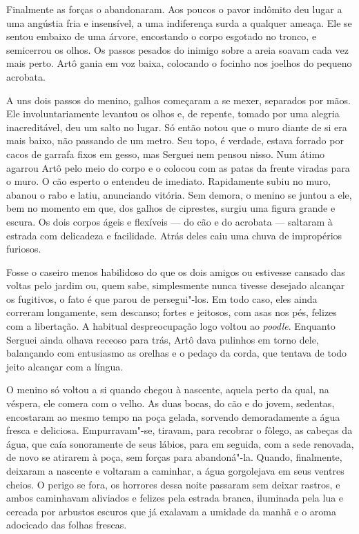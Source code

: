 Finalmente as forças o abandonaram. Aos poucos o pavor indômito deu
lugar a uma angústia fria e insensível, a uma indiferença surda a
qualquer ameaça. Ele se sentou embaixo de uma árvore, encostando o corpo
esgotado no tronco, e semicerrou os olhos. Os passos pesados do inimigo
sobre a areia soavam cada vez mais perto. Artô gania em voz baixa,
colocando o focinho nos joelhos do pequeno acrobata.

A uns dois passos do menino, galhos começaram a se mexer, separados por
mãos. Ele involuntariamente levantou os olhos e, de repente, tomado por
uma alegria inacreditável, deu um salto no lugar. Só então notou que o
muro diante de si era mais baixo, não passando de um metro. Seu topo, é
verdade, estava forrado por cacos de garrafa fixos em gesso, mas Serguei
nem pensou nisso. Num átimo agarrou Artô pelo meio do corpo e o
colocou com as patas da frente viradas para o muro. O cão esperto o
entendeu de imediato. Rapidamente subiu no muro, abanou o rabo e latiu,
anunciando vitória. Sem demora, o menino se juntou a ele, bem no momento
em que, dos galhos de ciprestes, surgiu uma figura grande e escura. Os
dois corpos ágeis e flexíveis --- do cão e do acrobata --- saltaram à estrada com delicadeza e facilidade. Atrás deles caiu uma chuva de
impropérios furiosos.

Fosse o caseiro menos habilidoso do que os dois amigos ou estivesse
cansado das voltas pelo jardim ou, quem sabe, simplesmente nunca tivesse
desejado alcançar os fugitivos, o fato é que parou de persegui"-los. Em
todo caso, eles ainda correram longamente, sem descanso; fortes e
jeitosos, com asas nos pés, felizes com a libertação. A habitual
despreocupação logo voltou ao \emph{poodle}. Enquanto Serguei ainda olhava
receoso para trás, Artô dava pulinhos em torno dele, balançando
com entusiasmo as orelhas e o pedaço da corda, que tentava de todo jeito
alcançar com a língua.

O menino só voltou a si quando chegou à nascente, aquela perto da qual,
na véspera, ele comera com o velho. As duas bocas, do cão e do jovem,
sedentas, encostaram ao mesmo tempo na poça gelada, sorvendo
demoradamente a água fresca e deliciosa. Empurravam"-se, tiravam, para
recobrar o fôlego, as cabeças da água, que caía sonoramente de seus
lábios, para em seguida, com a sede renovada, de novo se atirarem à
poça, sem forças para abandoná"-la. Quando, finalmente, deixaram a
nascente e voltaram a caminhar, a água gorgolejava em seus ventres
cheios. O perigo se fora, os horrores dessa noite passaram sem deixar
rastros, e ambos caminhavam aliviados e felizes pela estrada branca,
iluminada pela lua e cercada por arbustos escuros que já exalavam a
umidade da manhã e o aroma adocicado das folhas frescas.

